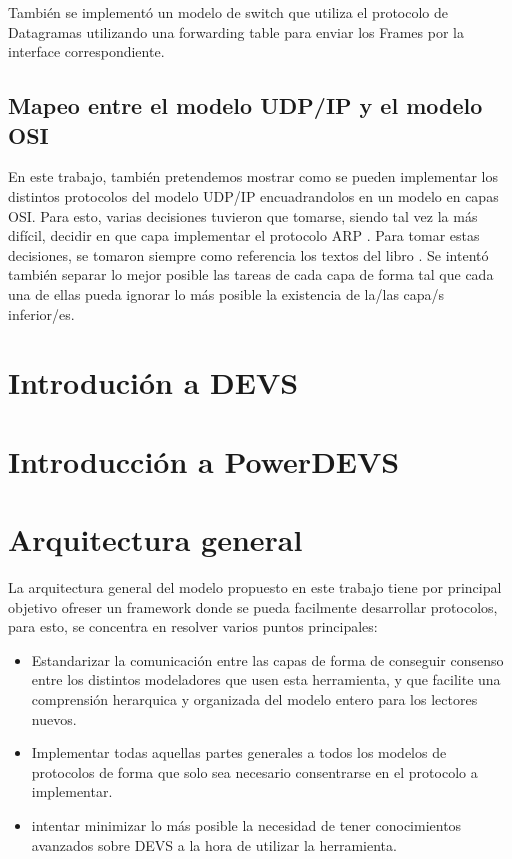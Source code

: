 \documentclass[10pt,a4paper]{article}
\begin{document}
También se implementó un modelo de switch que utiliza el protocolo de Datagramas \cite{petersonSwitchDatagram} utilizando una forwarding table para enviar los Frames por la interface correspondiente. 

\subsection{Mapeo entre el modelo UDP/IP y el modelo OSI}

En este trabajo, también pretendemos mostrar como se pueden implementar los distintos protocolos del modelo UDP/IP encuadrandolos en un modelo en capas OSI. Para esto, varias decisiones tuvieron que tomarse, siendo tal vez la más difícil, decidir en que capa implementar el protocolo ARP \cite[p.~228]{peterson2007computer}. Para tomar estas decisiones, se tomaron siempre como referencia los textos del libro \cite{peterson2007computer}. Se intentó también separar lo mejor posible las tareas de cada capa de forma tal que cada una de ellas pueda ignorar lo más posible la existencia de la/las capa/s inferior/es.

\section{Introdución a DEVS}
\section{Introducción a PowerDEVS}
\section{Arquitectura general}

La arquitectura general del modelo propuesto en este trabajo tiene por principal objetivo ofreser un framework donde se pueda facilmente desarrollar protocolos, para esto, se concentra en resolver varios puntos principales:

\begin{itemize}
\item Estandarizar la comunicación entre las capas de forma de conseguir consenso entre los distintos modeladores que usen esta herramienta, y que facilite una comprensión herarquica y organizada del modelo entero para los lectores nuevos.
\item Implementar todas aquellas partes generales a todos los modelos de protocolos de forma que solo sea necesario consentrarse en el protocolo a implementar.
\item intentar minimizar lo más posible la necesidad de tener conocimientos avanzados sobre DEVS a la hora de utilizar la herramienta.
\end{itemize}
\end{document}
